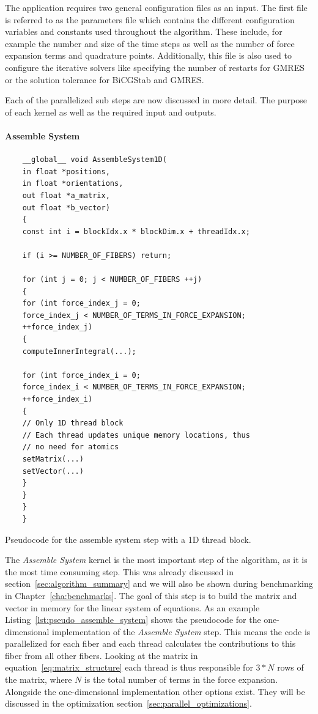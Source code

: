 The application requires two general configuration files as an input. The first file is referred to as the parameters file which contains the different configuration variables and constants used throughout the algorithm. These include, for example the number and size of the time steps as well as the number of force expansion terms and quadrature points. Additionally, this file is also used to configure the iterative solvers like specifying the number of restarts for GMRES or the solution tolerance for BiCGStab and GMRES.

Each of the parallelized sub steps are now discussed in more detail. The purpose of each kernel as well as the required input and outputs.

\paragraph{Assemble System}

\begin{listing}[!htbp]
  \centering
  \begin{verbatim}
    __global__ void AssembleSystem1D(
    in float *positions,
    in float *orientations,
    out float *a_matrix,
    out float *b_vector)
    {
    const int i = blockIdx.x * blockDim.x + threadIdx.x;

    if (i >= NUMBER_OF_FIBERS) return;

    for (int j = 0; j < NUMBER_OF_FIBERS ++j)
    {
    for (int force_index_j = 0;
    force_index_j < NUMBER_OF_TERMS_IN_FORCE_EXPANSION;
    ++force_index_j)
    {
    computeInnerIntegral(...);

    for (int force_index_i = 0;
    force_index_i < NUMBER_OF_TERMS_IN_FORCE_EXPANSION;
    ++force_index_i)
    {
    // Only 1D thread block
    // Each thread updates unique memory locations, thus
    // no need for atomics
    setMatrix(...)
    setVector(...)
    }
    }
    }
    }
  \end{verbatim}
  \caption{Pseudocode for the assemble system step with a 1D thread block.}
  \label{lst:pseudo_assemble_system}
\end{listing}

The \emph{Assemble System} kernel is the most important step of the algorithm, as it is the most time consuming step. This was already discussed in section~\ref{sec:algorithm_summary} and we will also be shown during benchmarking in Chapter~\ref{cha:benchmarks}. The goal of this step is to build the matrix and vector in memory for the linear system of equations. As an example Listing~\ref{lst:pseudo_assemble_system} shows the pseudocode for the one-dimensional implementation of the \emph{Assemble System} step. This means the code is parallelized for each fiber and each thread calculates the contributions to this fiber from all other fibers. Looking at the matrix in equation~\eqref{eq:matrix_structure} each thread is thus responsible for $3*N$ rows of the matrix, where $N$ is the total number of terms in the force expansion. Alongside the one-dimensional implementation other options exist. They will be discussed in the optimization section~\ref{sec:parallel_optimizations}.


